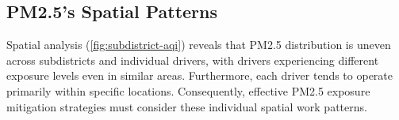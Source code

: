 
\subsection{PM2.5's Spatial Patterns}

Spatial analysis (\autoref{fig:subdistrict-aqi}) reveals that PM2.5 distribution is uneven across subdistricts and individual drivers, with drivers experiencing different exposure levels even in similar areas.
Furthermore, each driver tends to operate primarily within specific locations.
Consequently, effective PM2.5 exposure mitigation strategies must consider these individual spatial work patterns.


